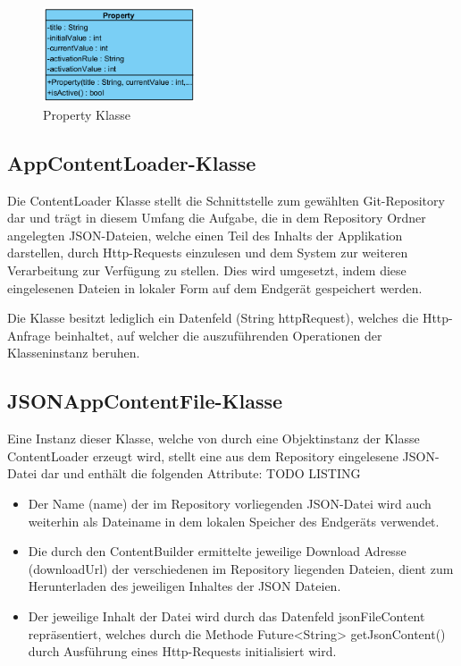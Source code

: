 \documentclass[bibliography=totoc,listof=totoc,BCOR=5mm,DIV=12,oneside]{scrbook}
\begin{document}
\begin{figure}[H]
	\centering
	\includegraphics[width=0.4\textwidth, keepaspectratio]{Bilder/ClassProperty.png}
	\caption{Property Klasse}
	\label{img:propertyClass}
\end{figure}

\newpage
\subsection{AppContentLoader-Klasse}
\par Die ContentLoader Klasse stellt die Schnittstelle zum gewählten Git-Repository dar und trägt in diesem Umfang die Aufgabe, die in dem Repository Ordner angelegten JSON-Dateien, welche einen Teil des Inhalts der Applikation darstellen, durch Http-Requests  einzulesen und dem System zur weiteren Verarbeitung zur Verfügung zu stellen. Dies wird umgesetzt, indem diese eingelesenen Dateien in lokaler Form auf dem Endgerät gespeichert werden.
\par Die Klasse besitzt lediglich ein Datenfeld (String httpRequest), welches die Http-Anfrage beinhaltet, auf welcher die auszuführenden Operationen der Klasseninstanz beruhen.

\subsection{JSONAppContentFile-Klasse}
\par Eine Instanz dieser Klasse, welche von durch eine Objektinstanz der Klasse ContentLoader erzeugt wird, stellt eine aus dem Repository eingelesene JSON-Datei dar und enthält die folgenden Attribute:
TODO LISTING
\begin{itemize}
\item \par Der Name (name) der im Repository vorliegenden JSON-Datei wird auch weiterhin als Dateiname in dem lokalen Speicher des Endgeräts verwendet.
\item \par Die durch den ContentBuilder ermittelte jeweilige Download Adresse (downloadUrl) der verschiedenen im Repository liegenden Dateien, dient zum Herunterladen des jeweiligen Inhaltes der JSON Dateien.
\item \par Der jeweilige Inhalt der Datei wird durch das Datenfeld jsonFileContent repräsentiert, welches durch die Methode Future<String> getJsonContent() durch Ausführung eines Http-Requests initialisiert wird.

\end{itemize}
\end{document}
